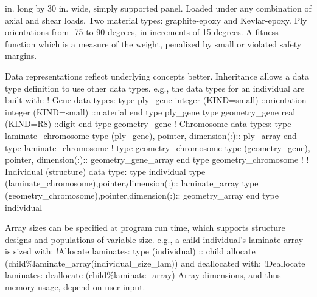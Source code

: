 \bigskip\bigskip
{} in. long by 30 in. wide, simply supported panel.
\bull Loaded under any combination of axial and shear loads.
\bull Two material types: graphite-epoxy and Kevlar-epoxy.
\bull Ply orientations from  -75 to 90 degrees, in increments
of 15 degrees.
\bull A fitness function which is a measure of the weight, penalized
by small or violated safety margins.

\vfil
\vskip-12pt
\eject


\vfil
\vfil
\eject

\bigskip
Data representations reflect underlying concepts better.
\medskip
Inheritance allows a data type definition to use other data types.
\medskip
e.g., the data types for an individual are built with:
\bigskip
{\verbatim
! Gene data types:
    type ply\_gene
        integer (KIND=small)  ::orientation
        integer (KIND=small)  ::material
    end type ply\_gene
\medskip
    type geometry\_gene
        real (KIND=R8)  ::digit
    end type geometry\_gene
}\vfil\eject
{}
\bigskip
{\verbatim
! Chromosome data types:
type laminate\_chromosome
    type (ply\_gene), pointer, dimension(:):: ply\_array
end type laminate\_chromosome
!
type geometry\_chromosome
    type (geometry\_gene), pointer, dimension(:):: geometry\_gene\_array
end type geometry\_chromosome
!
! Individual (structure) data type:
type individual
    type (laminate\_chromosome),pointer,dimension(:):: laminate\_array
    type (geometry\_chromosome),pointer,dimension(:):: geometry\_array
end type individual
}
\vfil\eject

\bigskip
Array sizes can be specified at program run time, which
supports structure designs and populations of variable size.
\medskip
e.g., a child individual's laminate array is sized with:
\bigskip
{\shift\vbox
{\verbatim
!Allocate laminates:
type (individual) :: child
allocate (child\%laminate\_array(individual\_size\_lam))
}
}
\medskip
and deallocated with:
\medskip
{\shift\vbox
{\verbatim
!Deallocate laminates:
deallocate (child\%laminate\_array)
}
}
\bigskip
Array dimensions, and thus memory usage, depend on user input.
 
